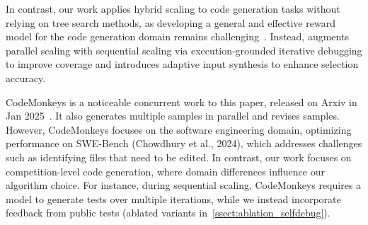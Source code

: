 In contrast, our work applies hybrid scaling to code generation tasks without relying on tree search methods, as developing a general and effective reward model for the code generation domain remains challenging~\citep{AceCoder}. Instead, \frameworkname augments parallel scaling with sequential scaling via execution-grounded iterative debugging to improve coverage and introduces adaptive input synthesis to enhance selection accuracy.




CodeMonkeys is a noticeable concurrent work to this paper, released on Arxiv in Jan 2025~\citep{ehrlich2025codemonkeys}. It also generates multiple samples in parallel and revises samples. However, CodeMonkeys focuses on the software engineering domain, optimizing performance on SWE-Bench (Chowdhury et al., 2024),
which addresses challenges such as identifying files
that need to be edited. In contrast, our work focuses on competition-level code generation, where domain differences influence our algorithm choice. For instance, during sequential scaling, CodeMonkeys requires a model to generate tests over multiple iterations, while we instead incorporate feedback from public tests (ablated variants in~\cref{ssect:ablation_selfdebug}).